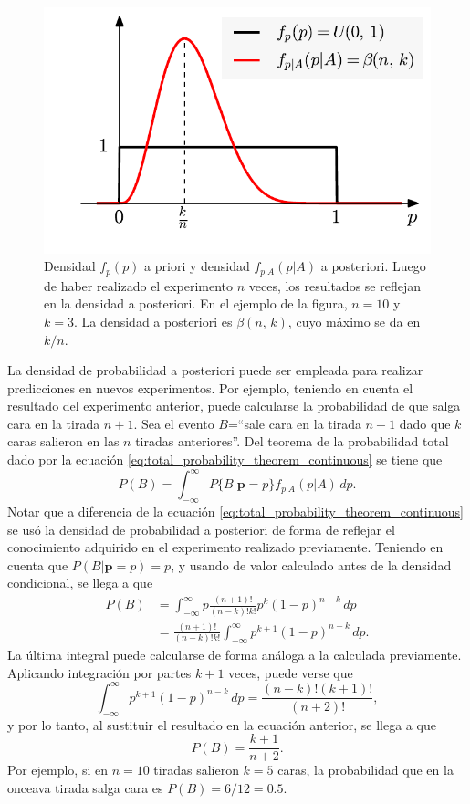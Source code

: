 \documentclass[a4paper]{report}
\newcommand{\p}{\mathbf{p}}
\begin{document}
\begin{figure}[!htb]
  \begin{minipage}[c]{0.52\textwidth}
    \includegraphics[width=\textwidth]{figuras/flip_coin_posterior_probability.pdf}
  \end{minipage}\hfill
  \begin{minipage}[c]{0.45\textwidth}
    \caption{
       Densidad \(f_p(p)\) a priori y densidad \(f_{p|A}(p|A)\) a posteriori. Luego de haber realizado el experimento \(n\) veces, los resultados se reflejan en la densidad a posteriori. En el ejemplo de la figura, \(n=10\) y \(k=3\). La densidad a posteriori es \(\beta(n,\,k)\), cuyo máximo se da en \(k/n\).
    } \label{fig:flip_coin_posterior_probability}
  \end{minipage}
\end{figure}

La densidad de probabilidad a posteriori puede ser empleada para realizar predicciones en nuevos experimentos. Por ejemplo, teniendo en cuenta el resultado del experimento anterior, puede calcularse la probabilidad de que salga cara en la tirada \(n+1\). Sea el evento \(B\)=``sale cara en la tirada \(n+1\) dado que \(k\) caras salieron en las \(n\) tiradas anteriores''. Del teorema de la probabilidad total dado por la ecuación \ref{eq:total_probability_theorem_continuous} se tiene que
\[
 P(B)=\int_{-\infty}^{\infty}P\{B|\p = p\}f_{p|A}(p|A)\,dp.
\]
Notar que a diferencia de la ecuación \ref{eq:total_probability_theorem_continuous} se usó la densidad de probabilidad a posteriori de forma de reflejar el conocimiento adquirido en el experimento realizado previamente. Teniendo en cuenta que \(P(B|\p=p)=p\), y usando de valor calculado antes de la densidad condicional, se llega a que
\begin{align*}
 P(B)&=\int_{-\infty}^{\infty}p\frac{(n+1)!}{(n-k)!k!}p^k(1-p)^{n-k}\,dp\\
     &=\frac{(n+1)!}{(n-k)!k!}\int_{-\infty}^{\infty}p^{k+1}(1-p)^{n-k}\,dp.
\end{align*}
La última integral puede calcularse de forma análoga a la calculada previamente. Aplicando integración por partes \(k+1\) veces, puede verse que
\[
 \int_{-\infty}^{\infty}p^{k+1}(1-p)^{n-k}\,dp=\frac{(n-k)!(k+1)!}{(n+2)!},
\]
y por lo tanto, al sustituir el resultado en la ecuación anterior, se llega a que
\[
 P(B)=\frac{k+1}{n+2}.
\]
Por ejemplo, si en \(n=10\) tiradas salieron \(k=5\) caras, la probabilidad que en la onceava tirada salga cara es \(P(B)=6/12=0.5\).
\end{document}
